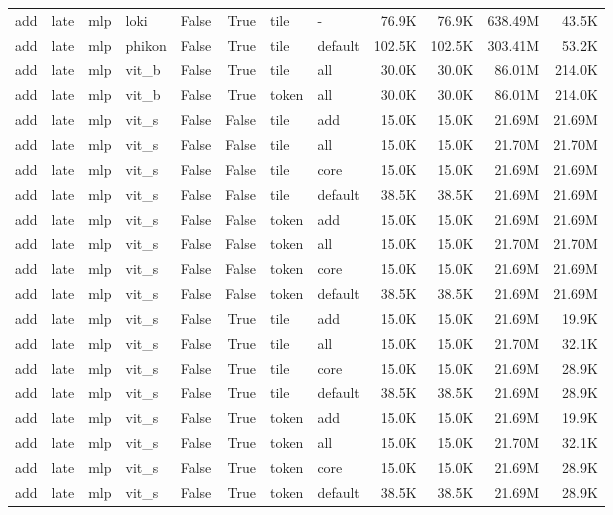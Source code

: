 \begin{table}
\begin{tabular}{llllrrllrrrr}
add & late & mlp & loki & False & True & tile & - & 76.9K & 76.9K & 638.49M & 43.5K \\
add & late & mlp & phikon & False & True & tile & default & 102.5K & 102.5K & 303.41M & 53.2K \\
add & late & mlp & vit\_b & False & True & tile & all & 30.0K & 30.0K & 86.01M & 214.0K \\
add & late & mlp & vit\_b & False & True & token & all & 30.0K & 30.0K & 86.01M & 214.0K \\
add & late & mlp & vit\_s & False & False & tile & add & 15.0K & 15.0K & 21.69M & 21.69M \\
add & late & mlp & vit\_s & False & False & tile & all & 15.0K & 15.0K & 21.70M & 21.70M \\
add & late & mlp & vit\_s & False & False & tile & core & 15.0K & 15.0K & 21.69M & 21.69M \\
add & late & mlp & vit\_s & False & False & tile & default & 38.5K & 38.5K & 21.69M & 21.69M \\
add & late & mlp & vit\_s & False & False & token & add & 15.0K & 15.0K & 21.69M & 21.69M \\
add & late & mlp & vit\_s & False & False & token & all & 15.0K & 15.0K & 21.70M & 21.70M \\
add & late & mlp & vit\_s & False & False & token & core & 15.0K & 15.0K & 21.69M & 21.69M \\
add & late & mlp & vit\_s & False & False & token & default & 38.5K & 38.5K & 21.69M & 21.69M \\
add & late & mlp & vit\_s & False & True & tile & add & 15.0K & 15.0K & 21.69M & 19.9K \\
add & late & mlp & vit\_s & False & True & tile & all & 15.0K & 15.0K & 21.70M & 32.1K \\
add & late & mlp & vit\_s & False & True & tile & core & 15.0K & 15.0K & 21.69M & 28.9K \\
add & late & mlp & vit\_s & False & True & tile & default & 38.5K & 38.5K & 21.69M & 28.9K \\
add & late & mlp & vit\_s & False & True & token & add & 15.0K & 15.0K & 21.69M & 19.9K \\
add & late & mlp & vit\_s & False & True & token & all & 15.0K & 15.0K & 21.70M & 32.1K \\
add & late & mlp & vit\_s & False & True & token & core & 15.0K & 15.0K & 21.69M & 28.9K \\
add & late & mlp & vit\_s & False & True & token & default & 38.5K & 38.5K & 21.69M & 28.9K \\

\end{tabular}
\end{table}
